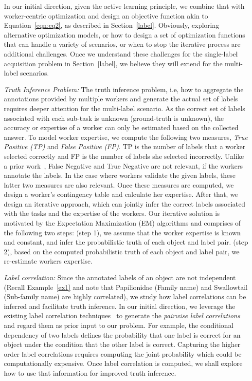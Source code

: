 In our initial direction, given the active learning principle, we combine that with worker-centric optimization and design an objective function akin to Equation~\ref{eqn:eq2}, as described in Section~\ref{label}. Obviously, exploring alternative optimization models, or how to design a set of optimization functions that can handle a variety of scenarios, or when to stop the iterative process are additional challenges. Once we understand these challenges for the single-label acquisition problem in Section~\ref{label}, we believe they will extend for the multi-label scenarios.

{\em  Truth Inference Problem:}
The truth inference problem, i.e, how to aggregate the annotations provided by multiple workers and generate the actual set of labels requires deeper attention for the multi-label scenario. As the correct set of labels associated with each sub-task is unknown (ground-truth is unknown), the accuracy or expertise of a worker can only be estimated based on the collected answer. To model worker expertise, we compute the following two measures, {\em True Positive (TP)} and {\em False Positive (FP)}. TP is the number of labels that a worker selected correctly and FP is the number of labels she selected incorrectly. Unlike a prior work~\cite{zhao2012bayesian}, False Negative and True Negative are not relevant, if the workers annotate the labels. In the case where workers validate the given labels, these latter two measures are also relevant. Once these measures are computed, we design a worker's contingency table and calculate her expertise. After that, we design an iterative approach, which can jointly infer the correct labels associated with the tasks and the expertise of the workers.  Our iterative solution is motivated by the Expectation Maximization (EM) algorithms and comprises of the following two steps: (step 1), we assume that the worker expertise is known and constant, and infer the probabilistic truth of each object and label pair. (step 2), based on the computed probabilistic truth of each object and label pair, we re-estimate workers expertise.

{\em  Label correlation:}
Since the annotated labels of an object are not independent (Recall Example~\ref{ex1} and note that Papilionidae (Family name) and Swallowtail (Sub-family name) are highly correlated), we study how label correlations can be inferred and facilitate truth inference. In our initial direction, we leverage the existing label correlation techniques~\cite{lc1,lc2} to generate the {\em pairwise label correlations} and regard them as prior input to our problem. %
For example, the conditional dependency of two labels defines the probability that one label is correct for an object under the condition that the other label is correct. Capturing the higher order label correlations requires computing the joint probability which could be computationally expensive. Once label correlation is computed, we shall explore how to use that information for improved truth inference. 
 \vspace{-0.1in}
